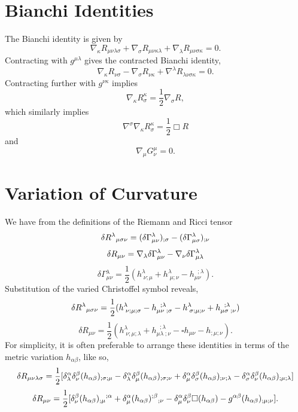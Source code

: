 \section{Bianchi Identities}
The Bianchi identity is given by
\[
\nabla_{\kappa}R_{\mu\nu\lambda\sigma}+\nabla_{\sigma}R_{\mu\nu\kappa\lambda}+\nabla_{\lambda}R_{\mu\nu\sigma\kappa}=0
.\]
Contracting with $g^{\mu\lambda}$ gives the contracted Bianchi identity,
\[
\nabla_{\kappa}R_{\nu\sigma}-\nabla_{\sigma}R_{\nu\kappa}+\nabla^{\lambda}R_{\lambda\nu\sigma\kappa}=0
.\]
Contracting further with $g^{\nu\kappa}$ implies
\[
\nabla_{\kappa}R_{\sigma}^{\kappa}=\frac{1}{2}\nabla_{\sigma}R
,\]
which similarly implies
\[
\nabla^{\sigma}\nabla_{\kappa}R_{\sigma}^{\kappa}=\frac{1}{2}\Box R
\]
and
\[
\nabla_\mu G^\mu_\nu=0
.\]
\section{Variation of Curvature}
\label{sec:Appvary}
We have from the definitions of the Riemann and Ricci tensor
\[
\delta
R^{\lambda}{ }_{\mu\sigma\nu}=(\delta\Gamma_{\mu\nu}^{\lambda})_{;\sigma}
-(\delta\Gamma_{\mu\sigma}^{\lambda})_{;\nu}\nonumber
\]
\[
\nonumber
 \delta
R_{\mu\nu}=\nabla_{\lambda}\delta\Gamma_{\mu\nu}^{\lambda}-\nabla_
{\nu}\delta\Gamma_{\mu\lambda}^{\lambda}
\]
\[
\delta\Gamma{}_{\mu\nu}^{\lambda}=\frac{1}{2}(h_{\;\nu;\mu}^{\lambda}+h_{
\;\mu;\nu}^{\lambda}-h_{\mu\nu}^{\;\;;\lambda}).
\]
Substitution of the varied Christoffel symbol reveals,
\[
\nonumber
\delta
R^{\lambda}{ }_{\mu\sigma\nu}=\frac{1}{2}(h_{\;\nu;\mu;\sigma}^{\lambda}-h_{
\mu\nu\;;\sigma}^{\;\;;\lambda}-h_{\;\sigma;\mu;\nu}^{\lambda}+h_{
\mu\sigma\;;\nu}^{\;\;;\lambda})
\]
\[
\delta
R_{\mu\nu}=\frac{1}{2}(h_{\;\nu;\mu;\lambda}^{\lambda}+h_{\mu\lambda\;;\nu}^{
\;\;;\lambda}-\square h_{\mu\nu}-h_{;\mu;\nu}).
\]
For simplicity, it is often preferable to arrange these identities in terms of the metric variation
$h_{\alpha\beta}$, like so,
\[
\nonumber
 \delta
R_{\mu\nu\lambda\sigma}=\frac{1}{2}[\delta_{\lambda}^{\alpha}\delta_{\nu}^{\beta
}(h_{\alpha\beta})_{;\sigma;\mu}-\delta_{\lambda}^{\alpha}\delta_{\mu}^{\beta}
(h_{\alpha\beta})_{;\sigma;\nu}+\delta_{\mu}^{\alpha}\delta_{\sigma}^{\beta}(h_{
\alpha\beta})_{;\nu;\lambda}-\delta_{\sigma}^{\alpha}\delta_{\nu}^{\beta}(h_{
\alpha\beta})_{;\mu;\lambda}]
\]
\[
 \delta
R_{\mu\nu}=\frac{1}{2}[\delta_{\nu}^{\beta}(h_{\alpha\beta})_{;\mu}{ }^{;\alpha}
+\delta_{\mu}^{\alpha}(h_{\alpha\beta})^{;\beta}{ }_{;\nu}-\delta_{\mu}^{\alpha}
\delta_{\nu}^{\beta}\square(h_{\alpha\beta})-g^{\alpha\beta}(h_{\alpha\beta})_{
;\mu;\nu}]
.\]
